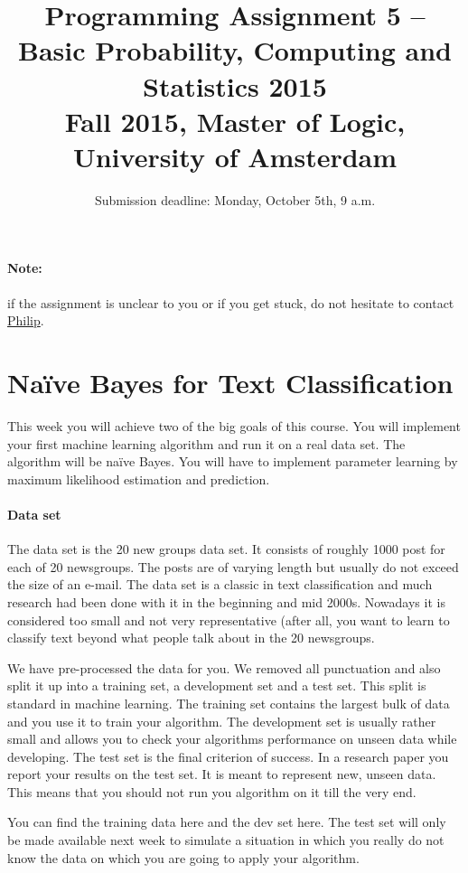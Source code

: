 \documentclass[11pt, leqno, a4paper]{article}
\title{Programming Assignment 5 -- Basic Probability, Computing and Statistics 2015 \\[2mm]
\large{Fall 2015, Master of Logic, University of Amsterdam}}
\author{}
\date{Submission deadline: Monday, October 5th, 9 a.m.}
\begin{document}
\maketitle

\paragraph{Note:} if the assignment is unclear to you or if you get stuck, do not hesitate to contact \href{mailto:P.Schulz@uva.nl}{Philip}.

\section{Na\"ive Bayes for Text Classification}

This week you will achieve two of the big goals of this course. You will implement your first machine 
learning algorithm and run it on a real data set. The algorithm will be na\"ive Bayes. You will have to 
implement parameter learning by maximum likelihood estimation and prediction.

\paragraph{Data set} The data set is the 20 new groups data set. It consists of roughly 1000 post for each
of 20 newsgroups. The posts are of varying length but usually do not exceed the size of an e-mail. The
data set is a classic in text classification and much research had been done with it in the beginning and
mid 2000s. Nowadays it is considered too small and not very representative (after all, you want to learn
to classify text beyond what people talk about in the 20 newsgroups.

We have pre-processed the data for you. We removed all punctuation and also split it up into a training
set, a development set and a test set. This split is standard in machine learning. The training set contains
the largest bulk of data and you use it to train your algorithm. The development set is usually rather
small and allows you to check your algorithms performance on unseen data while developing. The test set
is the final criterion of success. In a research paper you report your results on the test set. It is meant
to represent new, unseen data. This means that you should not run you algorithm on it till the very end.

You can find the training data here and the dev set here. The test set will only be made available next week
to simulate a situation in which you really do not know the data on which you are going to apply your 
algorithm.
\end{document}
